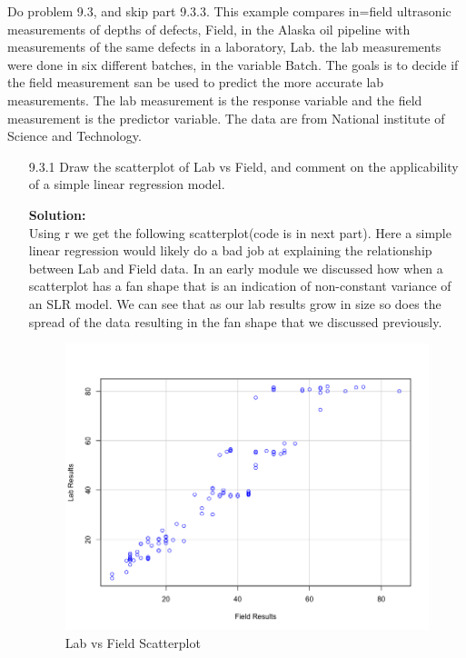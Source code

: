 \documentclass[12pt]{article}
\makeatletter
\theoremstyle{homework}
\newenvironment{exercise}[1]
{\def\@currentlabel{#1}\exercisecore}
{\endexercisecore}
\newcommand{\localhead}[1]{\par\smallskip\noindent\textbf{#1}\nobreak\\}%
\newcommand\solution{\localhead{Solution:}}
\makeatother
\begin{document}
\begin{exercise}{2} Do problem 9.3, and skip part 9.3.3. This example compares in=field ultrasonic measurements of depths of defects, Field, in the 
  Alaska oil pipeline with measurements of the same defects in a laboratory, Lab. the lab measurements were done in six different batches, in the variable Batch. The 
  goals is to decide if the field measurement san be used to predict the more accurate lab measurements. The lab measurement is the response variable and the field measurement 
  is the predictor variable. The data are from National institute of Science and Technology.\\
  \begin{enumerate}
    \item[9.3.1] Draw the scatterplot of Lab vs Field, and comment on the applicability of a simple linear regression model.\\
    \solution  Using r we get the following scatterplot(code is in next part). Here a simple linear regression would likely do a bad job at explaining the 
    relationship between Lab and Field data. In an early module we discussed how when a scatterplot has a fan shape that is an 
    indication of non-constant variance of an SLR model. We can see that as our lab results grow in size so does the spread of the data resulting 
    in the fan shape that we discussed previously. 
    \begin{figure}[H]
      \begin{center}
      \caption{Lab vs Field Scatterplot}
      \includegraphics[width = .94\textwidth]{Rplot01.png}
    \end{center}
  \end{figure}
  \newpage





\end{enumerate}
\end{exercise}
\end{document}
